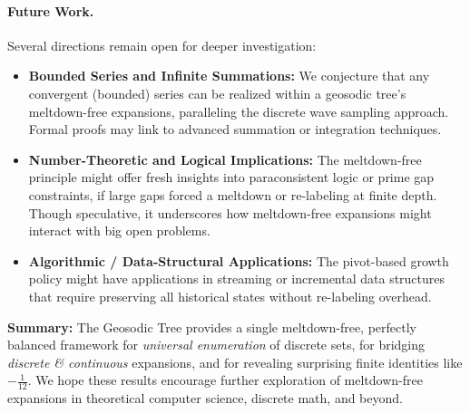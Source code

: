 \documentclass[acmsmall]{acmart}
\theoremstyle{definition}
\theoremstyle{remark}
\begin{document}
\paragraph{Future Work.}
Several directions remain open for deeper investigation:
\begin{itemize}
  \item \textbf{Bounded Series and Infinite Summations:}
    We conjecture that any convergent (bounded) series can be realized
    within a geosodic tree’s meltdown-free expansions, paralleling
    the discrete wave sampling approach. Formal proofs may link to advanced
    summation or integration techniques.
  \item \textbf{Number-Theoretic and Logical Implications:}
    The meltdown-free principle might offer fresh insights into paraconsistent
    logic or prime gap constraints, if large gaps forced a meltdown or re-labeling
    at finite depth. Though speculative, it underscores how meltdown-free expansions
    might interact with big open problems.
  \item \textbf{Algorithmic / Data-Structural Applications:}
    The pivot-based growth policy might have applications in streaming or
    incremental data structures that require preserving all historical states
    without re-labeling overhead. 
\end{itemize}

\smallskip
\noindent
\textbf{Summary:} 
The Geosodic Tree provides a single meltdown-free, perfectly balanced framework
for \emph{universal enumeration} of discrete sets, for bridging \emph{discrete
\& continuous} expansions, and for revealing surprising finite identities like
$-\tfrac{1}{12}$. We hope these results encourage further exploration of 
meltdown-free expansions in theoretical computer science, discrete math, 
and beyond.
 


\end{document}
